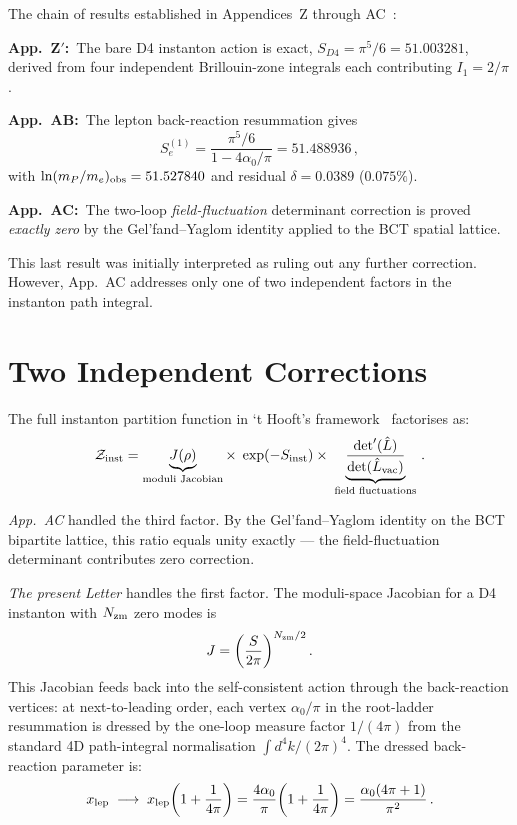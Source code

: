 \documentclass[twocolumn,10pt,a4paper]{article}
\begin{document}
The chain of results established in Appendices~Z through AC~\cite{monograph}:

\smallskip
\noindent\textbf{App.~Z$'$:}~The bare D4 instanton action is exact,
$S_{D4} = \pi^5/6 = 51.003281$, derived from four independent Brillouin-zone
integrals each contributing $I_1 = 2/\pi$.

\noindent\textbf{App.~AB:}~The lepton back-reaction resummation gives
\begin{equation}
  \label{eq:AB}
  S_e^{(1)} = \frac{\pi^5/6}{1 - 4\alpha_0/\pi} = 51.488936\,,
\end{equation}
with $\ln(m_P/m_e)_{\rm obs} = 51.527840$ and residual $\delta = 0.0389$
($0.075\%$).

\noindent\textbf{App.~AC:}~The two-loop \emph{field-fluctuation}
determinant correction is proved \emph{exactly zero} by the
Gel'fand--Yaglom identity applied to the BCT spatial lattice.

This last result was initially interpreted as ruling out any further
correction.  However, App.~AC addresses only one of two independent
factors in the instanton path integral.

\section{Two Independent Corrections}

The full instanton partition function in `t Hooft's framework~\cite{tHooft1976}
factorises as:
\begin{equation}
  \label{eq:Z}
  \mathcal{Z}_{\rm inst} =
    \underbrace{J(\rho)}_{\text{moduli Jacobian}}
    \times\;
    \exp(-S_{\rm inst})
    \times\;
    \underbrace{\frac{\det'(\hat{L})}{\det(\hat{L}_{\rm vac})}}_{\text{field fluctuations}}\,.
\end{equation}

\textit{App.~AC} handled the third factor.  By the Gel'fand--Yaglom identity
on the BCT bipartite lattice, this ratio equals unity exactly --- the
field-fluctuation determinant contributes zero correction.

\textit{The present Letter} handles the first factor.  The moduli-space
Jacobian for a D4 instanton with $N_{\rm zm}$ zero modes is
\begin{equation}
  J = \left(\frac{S}{2\pi}\right)^{N_{\rm zm}/2}.
\end{equation}
This Jacobian feeds back into the self-consistent action through the
back-reaction vertices: at next-to-leading order, each vertex
$\alpha_0/\pi$ in the root-ladder resummation is dressed by the
one-loop measure factor $1/(4\pi)$ from the standard 4D path-integral
normalisation $\int d^4k/(2\pi)^4$.  The dressed back-reaction parameter
is:
\begin{equation}
  \label{eq:dressed}
  x_{\rm lep} \;\longrightarrow\; x_{\rm lep}\!\left(1 + \frac{1}{4\pi}\right)
  = \frac{4\alpha_0}{\pi}\!\left(1 + \frac{1}{4\pi}\right)
  = \frac{\alpha_0(4\pi+1)}{\pi^2}\,.
\end{equation}
\end{document}
